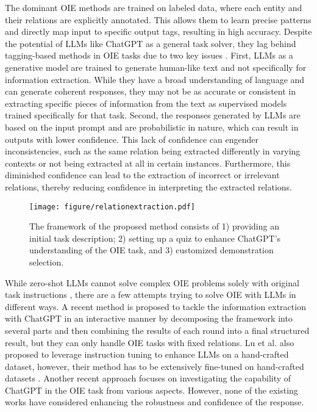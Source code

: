 \documentclass{article}
\begin{document}
The dominant OIE methods \cite{yu2021maximal,zhan2020span,kolluru2020imojie} are trained on labeled data, where each entity and their relations are explicitly annotated. This allows them to learn precise patterns and directly map input to specific output tags, resulting in high accuracy. Despite the potential of LLMs like ChatGPT as a general task solver, they lag behind tagging-based methods in OIE tasks due to two key issues \cite{ling2023beyond}. First, LLMs as a generative model are trained to generate human-like text and not specifically for information extraction. While they have a broad understanding of language and can generate coherent responses, they may not be as accurate or consistent in extracting specific pieces of information from the text as supervised models trained specifically for that task. Second, the responses generated by LLMs are based on the input prompt and are probabilistic in nature, which can result in outputs with lower confidence. This lack of confidence can engender inconsistencies, such as the same relation being extracted differently in varying contexts or not being extracted at all in certain instances. Furthermore, this diminished confidence can lead to the extraction of incorrect or irrelevant relations, thereby reducing confidence in interpreting the extracted relations.

\begin{figure*}[t]
\centering
\texttt{[image: figure/relationextraction.pdf]}
\vspace{-3mm}
\caption{The framework of the proposed method consists of 1) providing an initial task description; 2) setting up a quiz to enhance ChatGPT's understanding of the OIE task, and 3) customized demonstration selection.}
\label{fig: example}
\end{figure*}

While zero-shot LLMs cannot solve complex OIE problems solely with original task instructions \cite{ling2023beyond}, there are a few attempts \cite{lu2023pivoine,han2023information,wei2023zero} trying to solve OIE with LLMs in different ways. A recent method \cite{wei2023zero} is proposed to tackle the information extraction with ChatGPT in an interactive manner by decomposing the framework into several parts and then combining the results of each round into a final structured result, but they can only handle OIE tasks with fixed relations. Lu et al. also proposed to leverage instruction tuning to enhance LLMs on a hand-crafted dataset, however, their method has to be extensively fine-tuned on hand-crafted datasets \cite{lu2023pivoine}. Another recent approach \cite{han2023information} focuses on investigating the capability of ChatGPT in the OIE task from various aspects. However, none of the existing works have considered enhancing the robustness and confidence of the response.
\end{document}
